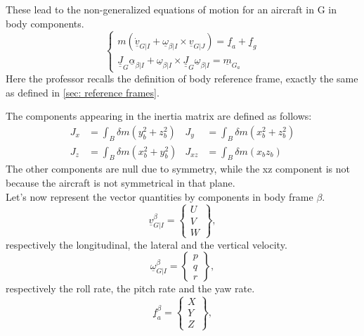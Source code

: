 These lead to the non-generalized equations of motion for an aircraft in G in body components.
\begin{equation}
    \begin{cases}
        m(\underline{\dot v}_{G|I} + \underline{\omega}_{\beta|I}\times \underline{v}_{G|J}) = \underline{f}_a+\underline{f}_g\\
        \underline{\underline{J}}_G\underline{\alpha}_{\beta|I}+\underline{\omega}_{\beta|I}\times\underline{\underline{J}}_G\underline{\omega}_{\beta|I} = \underline{m}_{G_a}
    \end{cases}    
\end{equation}
Here the professor recalls the definition of body reference frame, exactly the same as defined in \ref{sec: reference frames}.

The components appearing in the inertia matrix are defined as follows:
\begin{align}
    J_x &= \int_B \delta m(y_b^2 + z_b^2) & J_y &= \int_B \delta m(x_b^2 + z_b^2) \\ J_z &= \int_B \delta m(x_b^2 + y_b^2) & J_{xz} &= \int_B \delta m(x_bz_b)
\end{align}
The other components are null due to symmetry, while the xz component is not because the aircraft is not symmetrical in that plane.
\\
Let's now represent the vector quantities by components in body frame $\beta$.
\begin{equation}
\underline{v}_{G|I}^\beta =     \begin{Bmatrix}
        U\\V\\W
    \end{Bmatrix},
\end{equation}
respectively the longitudinal, the lateral and the vertical velocity.
\begin{equation}
\underline{\omega}_{G|I}^\beta =     \begin{Bmatrix}
        p\\q\\r
    \end{Bmatrix},
\end{equation}
respectively the roll rate, the pitch rate and the yaw rate.
\begin{equation}
\underline{f}_{a}^\beta =     \begin{Bmatrix}
        X\\Y\\Z
    \end{Bmatrix},
\end{equation}
